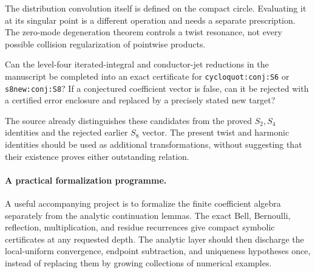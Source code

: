 The distribution convolution itself is defined on the compact
circle. Evaluating it at its singular point is a different
operation and needs a separate prescription. The zero-mode
degeneration theorem controls a twist resonance, not every
possible collision regularization of pointwise products.

\begin{question}
\label{future:q:targets}
Can the level-four iterated-integral and conductor-jet reductions
in the manuscript be completed into an exact certificate for
\texttt{cycloquot:conj:S6} or \texttt{s8new:conj:S8}?
If a conjectured coefficient vector is false, can it be rejected
with a certified error enclosure and replaced by a precisely
stated new target?
\end{question}

The source already distinguishes these candidates from the proved
\(S_2,S_4\) identities and the rejected earlier \(S_8\) vector.
The present twist and harmonic identities should be used as
additional transformations, without suggesting that their
existence proves either outstanding relation.

\paragraph{A practical formalization programme.}
A useful accompanying project is to formalize the finite coefficient
algebra separately from the analytic continuation lemmas. The exact
Bell, Bernoulli, reflection, multiplication, and residue recurrences
give compact symbolic certificates at any requested depth. The
analytic layer should then discharge the local-uniform convergence,
endpoint subtraction, and uniqueness hypotheses once, instead of
replacing them by growing collections of numerical examples.

